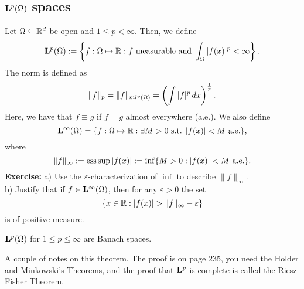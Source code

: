 \subsection*{$\mathbf{L}^p(\Omega)$ spaces}
Let $\Omega \subseteq {\mathbb R}^d$ be open and $1 \leq p < \infty$. Then, we define
\[ \mathbf{L}^p(\Omega) : = \left\lbrace f: \Omega \mapsto {\mathbb R} : f \text{ measurable  and } \displaystyle\int_{\Omega} |f(x) |^p < \infty \right\rbrace. \]
The norm is defined as 
\[ \| f \|_p = \| f \|_{ml^p(\Omega)} = \left( \displaystyle\int |f|^p \, dx \right)^{\frac{1}{p}}.\]
Here, we have that $f \equiv g$ if $f = g$ almost everywhere (a.e.). We also define 
\[
 \mathbf{L}^{\infty}(\Omega) = \{ f: \Omega \mapsto {\mathbb R} : \exists M > 0 \text{ s.t. } |f(x)| < M \text{ a.e.} \}, 
 \]
where 
\[ 
\|f\|_{\infty} : = \operatorname*{ess\,sup} |f(x)| : = \inf \{ M > 0 :  |f(x)| < M \text{ a.e.}\}.
  \]
 {\bf  Exercise:} a) Use the $\varepsilon$-characterization of $\inf$ to describe  $\|f\|_{\infty}$. \\
 b) Justify  that if $f \in  \mathbf{L}^{\infty}(\Omega)$, then for any $\varepsilon>0$ the set 
 \[
 \{ x\in \R: |f(x)|>\|f\|_{\infty} - \varepsilon\}
 \]
  is of positive measure. 
 
\begin{theorem}
$\mathbf{L}^p(\Omega)$ for $1 \leq p \leq \infty$ are Banach spaces.
\end{theorem}
A couple of notes on this theorem. The proof is on page 235, you need the Holder and Minkowski's Theorems, and the proof that $\mathbf{L}^p$ is complete is called the Riesz-Fisher Theorem.  
